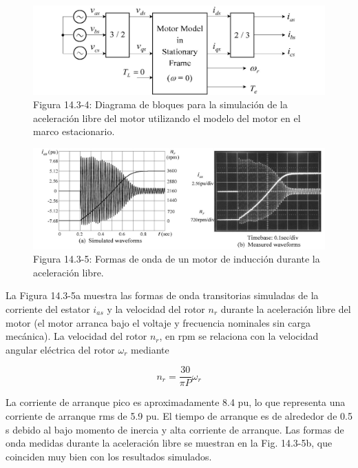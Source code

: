 \documentclass[letterpaper,12pt]{article}
\begin{document}
\begin{figure}[ht]
\centering
\includegraphics{graficos/img06.jpg}
\caption{Figura 14.3-4: Diagrama de bloques para la simulación de la aceleración libre del motor utilizando el modelo del motor en el marco estacionario.}
\end{figure}
\FloatBarrier

\begin{figure}[ht]
\centering
\includegraphics{graficos/img07.jpg}
\caption{Figura 14.3-5: Formas de onda de un motor de inducción durante la aceleración libre.}
\end{figure}
\FloatBarrier

La Figura 14.3-5a muestra las formas de onda transitorias simuladas de la corriente del estator $i_{as}$ y la velocidad del rotor $n_r$ durante la aceleración libre del motor (el motor arranca bajo el voltaje y frecuencia nominales sin carga mecánica). La velocidad del rotor $n_r$, en rpm se relaciona con la velocidad angular eléctrica del rotor $\omega_r$ mediante

\begin{equation}
n_r = \frac{30}{\pi P} \omega_r \tag{14.3-9}
\end{equation}

La corriente de arranque pico es aproximadamente 8.4 pu, lo que representa una corriente de arranque rms de 5.9 pu. El tiempo de arranque es de alrededor de 0.5 s debido al bajo momento de inercia y alta corriente de arranque. Las formas de onda medidas durante la aceleración libre se muestran en la Fig. 14.3-5b, que coinciden muy bien con los resultados simulados.
\end{document}
